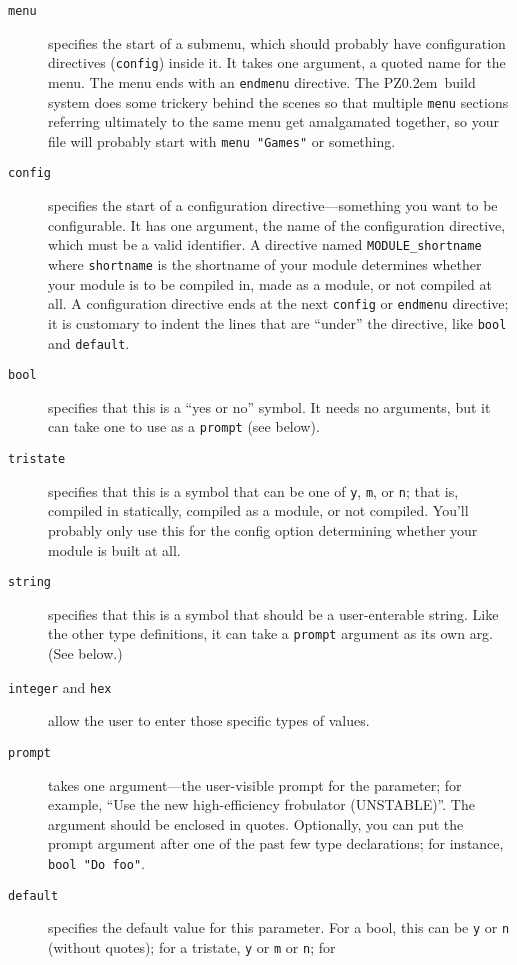 \documentclass[12pt,letterpaper]{report}
\def\pz{{\footnotesize PZ}}
\def\pzt{\pz\kern0.2em{\large\oldstyle2}}
\let\ttt\tt
\def\tt{\def\_{{\ttt\char`\_}}\ttt}
\begin{document}
\begin{description}
\item[{\tt menu}] specifies the start of a submenu, which should probably have configuration directives
(\verb|config|) inside it. It takes one argument, a quoted name for the menu. The menu ends with an 
\verb|endmenu| directive. The \pzt\ build system does some trickery behind the scenes so that
multiple \verb|menu| sections referring ultimately to the same menu get amalgamated together, so your
file will probably start with \verb|menu "Games"| or something.
\item[{\tt config}] specifies the start of a configuration directive---something you want to be
configurable. It has one argument, the name of the configuration directive, which must be
a valid identifier. A directive named \verb|MODULE_shortname| where \verb|shortname| is the
shortname of your module determines whether your module is to be compiled in, made as a module,
or not compiled at all. A configuration directive ends at the next \verb|config| or \verb|endmenu|
directive; it is customary to indent the lines that are ``under'' the directive, like \verb|bool|
and \verb|default|.
\item[{\tt bool}] specifies that this is a ``yes or no'' symbol. It needs no arguments, but it can take
one to use as a \verb|prompt| (see below).
\item[{\tt tristate}] specifies that this is a symbol that can be one of \verb|y|, \verb|m|, or \verb|n|;
that is, compiled in statically, compiled as a module, or not compiled. You'll probably only use
this for the config option determining whether your module is built at all.
\item[{\tt string}] specifies that this is a symbol that should be a user-enterable string. Like
the other type definitions, it can take a \verb|prompt| argument as its own arg. (See below.)
\item[{\tt integer} and {\tt hex}] allow the user to enter those specific types of values.
\item[{\tt prompt}] takes one argument---the user-visible prompt for the parameter; for example,
``Use the new high-efficiency frobulator (UNSTABLE)''. The argument should be enclosed in quotes.
Optionally, you can put the prompt argument after one of the past few type declarations; for instance,
\verb|bool "Do foo"|.
\item[{\tt default}] specifies the default value for this parameter. For a bool, this can be
\verb|y| or \verb|n| (without quotes); for a tristate, \verb|y| or \verb|m| or \verb|n|; for

\end{description}
\end{document}
